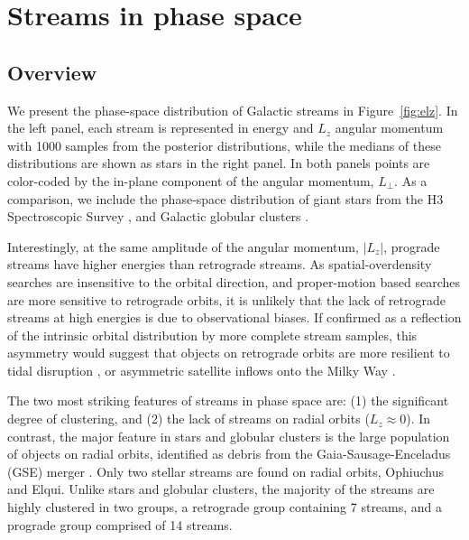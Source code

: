 \documentclass[twocolumn]{aastex63}
\begin{document}
\section{Streams in phase space}
\label{sec:phasespace}

\subsection{Overview}
\label{sec:elz}

We present the phase-space distribution of Galactic streams in Figure~\ref{fig:elz}.
In the left panel, each stream is represented in energy and $L_z$ angular momentum with 1000 samples from the posterior distributions, while the medians of these distributions are shown as stars in the right panel.
In both panels points are color-coded by the in-plane component of the angular momentum, $L_\perp$.
As a comparison, we include the phase-space distribution of giant stars from the H3 Spectroscopic Survey \citep[left panel, small black points;][]{conroy2019}, and Galactic globular clusters \citep[righ panel, small circles colored by $L_\perp$;][]{baumgardt2019}.

Interestingly, at the same amplitude of the angular momentum, $|L_z|$, prograde streams have higher energies than retrograde streams.
As spatial-overdensity searches are insensitive to the orbital direction, and proper-motion based searches are more sensitive to retrograde orbits, it is unlikely that the lack of retrograde streams at high energies is due to observational biases.
If confirmed as a reflection of the intrinsic orbital distribution by more complete stream samples, this asymmetry would suggest that objects on retrograde orbits are more resilient to tidal disruption \citep[e.g.,][]{velazquez1999}, or asymmetric satellite inflows onto the Milky Way \citep[e.g.,][]{herbert-fort2008}.

The two most striking features of streams in phase space are: (1) the significant degree of clustering, and (2) the lack of streams on radial orbits ($L_z\approx0$).
In contrast, the major feature in stars and globular clusters is the large population of objects on radial orbits, identified as debris from the Gaia-Sausage-Enceladus (GSE) merger \citep[e.g.,][]{belokurov2018, helmi2018, naidu2020}.
Only two stellar streams are found on radial orbits, Ophiuchus and Elqui.
Unlike stars and globular clusters, the majority of the streams are highly clustered in two groups, a retrograde group containing 7 streams, and a prograde group comprised of 14 streams.
\end{document}
